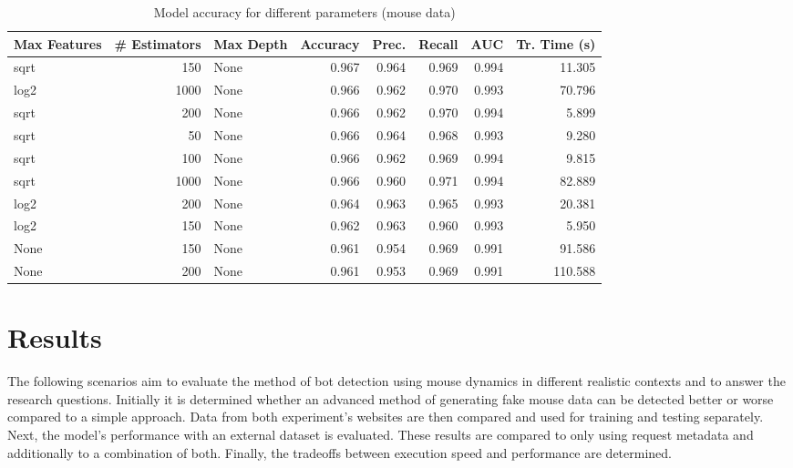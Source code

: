 \documentclass[
    fontsize=12pt,
    headings=small,
    parskip=half,           %
    bibliography=totoc,
    numbers=noenddot,       %
    open=any,               %
    final,                   %
    table
]{scrreprt}
\begin{document}
\begin{table}[H]
    \begin{center}
        \begin{tabular}{lrlrrrrr}
            \toprule Max Features & \# Estimators & Max Depth & Accuracy & Prec. & Recall & AUC & Tr. Time (s) \\
            \midrule
            sqrt & 150 & None & 0.967 & 0.964 & 0.969 & 0.994 & 11.305 \\
            log2 & 1000 & None & 0.966 & 0.962 & 0.970 & 0.993 & 70.796 \\
            \rowcolor{green!30}
            sqrt & 200 & None & 0.966 & 0.962 & 0.970 & 0.994 & 5.899 \\
            sqrt & 50 & None & 0.966 & 0.964 & 0.968 & 0.993 & 9.280 \\
            sqrt & 100 & None & 0.966 & 0.962 & 0.969 & 0.994 & 9.815 \\
            sqrt & 1000 & None & 0.966 & 0.960 & 0.971 & 0.994 & 82.889 \\
            log2 & 200 & None & 0.964 & 0.963 & 0.965 & 0.993 & 20.381 \\
            log2 & 150 & None & 0.962 & 0.963 & 0.960 & 0.993 & 5.950 \\
            None & 150 & None & 0.961 & 0.954 & 0.969 & 0.991 & 91.586 \\
            None & 200 & None & 0.961 & 0.953 & 0.969 & 0.991 & 110.588 \\
            \bottomrule
        \end{tabular}
    \end{center}
    \caption{Model accuracy for different parameters (mouse data)}
    \label{table:mouse_params}
\end{table}

\section{Results}

The following scenarios aim to evaluate the method of bot detection using mouse dynamics in different realistic contexts and to answer the research questions. Initially it is determined whether an advanced method of generating fake mouse data can be detected better or worse compared to a simple approach. Data from both experiment's websites are then compared and used for training and testing separately. Next, the model's performance with an external dataset is evaluated. These results are compared to only using request metadata and additionally to a combination of both. Finally, the tradeoffs between execution speed and performance are determined.
\end{document}
